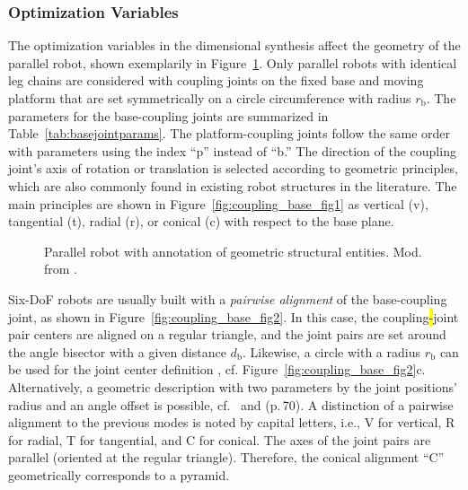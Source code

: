 %
%
%


\subsubsection{Optimization Variables}
\label{sec:dimsynth_optvars}


The optimization variables in the dimensional synthesis affect the geometry of the parallel robot, shown exemplarily in Figure~\ref{fig:def_structural_entities}. Only parallel robots with identical leg chains are considered with coupling joints on the fixed base and moving platform that are set symmetrically on a circle circumference with radius $r_\mathrm{b}$.
The parameters for the base-coupling joints are summarized in Table~\ref{tab:basejointparams}.
The platform-coupling joints follow the same order with parameters using the index ``p'' instead of ``b.''
%
%
%
The direction of the coupling joint's axis of rotation or translation is selected according to geometric principles, which are also commonly found in existing robot structures in the literature.
The main principles are shown in Figure~\ref{fig:coupling_base_fig1} as vertical (v), tangential (t), radial (r), or conical (c) with respect to the base plane.
%
%
\nocite{FrindtKreHes2010} %
\nocite{SchuetzBudRaaHes2011} %
\nocite{HuangLiDin2012} %
\nocite{StechertFra2007} %


\begin{figure}[H] %
  \graphicspath{{./Figures/}}
  
  \caption{Parallel robot with annotation of geometric structural entities. Mod. from \cite{FrindtKreHes2010}.}
  \label{fig:def_structural_entities}
\end{figure} 



Six-DoF robots are usually built with a \emph{pairwise alignment} of the base-coupling joint, as shown in Figure~\ref{fig:coupling_base_fig2}.
%
In this case, the coupling\hl{-}joint pair centers are aligned on a regular triangle, and the joint pairs are set around the angle bisector with a given distance $d_\mathrm{b}$.
Likewise, a circle with a radius $r_\mathrm{b}$ can be used for the joint center definition \cite{SchuetzBudRaaHes2011},
cf. \mbox{Figure~\ref{fig:coupling_base_fig2}c.}
Alternatively, a geometric description with two parameters by the joint positions' radius and an angle offset is possible, cf.~\cite{SuDuaZhe2001} and \cite{Daake2012} %
%
(p.\,70).
A distinction of a pairwise alignment to the previous modes is noted by capital letters, i.e., V for vertical, R for radial, T for tangential, and C for conical.
The axes of the joint pairs are parallel (oriented at the regular triangle).
Therefore, the conical alignment ``C'' geometrically corresponds to a pyramid.
%

